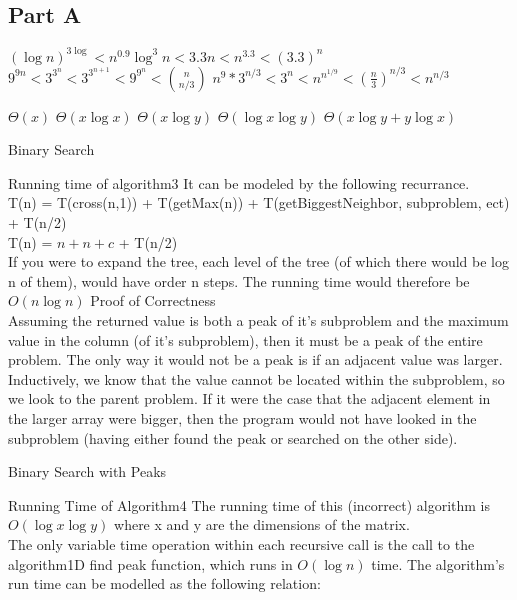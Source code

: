 \documentclass[12pt,twoside]{article}
\begin{document}
\begin{problems}
\section*{Part A}
\problem
\begin{problemparts}
\problempart $(\log n)^{3 \log } <  n^{0.9}\log^3n < 3.3n < n^{3.3}  < (3.3)^n$
\problempart $9^{9n} < 3^{3^n} < 3^{3^{n+1}}< 9^{9^n} < \binom{n}{n/3}$
\problempart $n^9*3^{n/3} < 3^n < n^{n^{1/9}}  < \left(\frac{n}{3}\right)^{n/3} < n^{n/3}$
\end{problemparts}
\problem
\begin{problemparts}
\problempart $\Theta(x)$
\problempart $\Theta(x \log x)$
\problempart $\Theta(x \log y)$
\problempart $\Theta( \log x \log y )$
\problempart $\Theta(x\log y + y \log x)$
\end{problemparts}
\problem Binary Search
\begin{problemparts}
\problempart Running time of algorithm3
It can be modeled by the following recurrance.\\
T(n) = T(cross(n,1)) + T(getMax(n)) + T(getBiggestNeighbor, subproblem, ect) + T(n/2)\\
T(n) = $n + n + c$ + T(n/2)\\
If you were to expand the tree, each level of the tree (of which there would be log n of them), would have order n steps.  The running time would
therefore be $O(n \log n)$
\problempart Proof of Correctness\\
Assuming the returned value is both a peak of it's subproblem and the maximum value in the column (of it's subproblem), then it must be a peak 
of the entire problem.  The only way it would not be a peak is if an adjacent value was larger.  Inductively, we know that the value cannot be
located within the subproblem, so we look to the parent problem.  If it were the case that the adjacent element in the larger array were bigger,
then the program would not have looked in the subproblem (having either found the peak or searched on the other side).
\end{problemparts}
\problem Binary Search with Peaks
\begin{problemparts}
\problempart Running Time of Algorithm4
The running time of this (incorrect) algorithm is $O(\log x \log y)$ where x and y are the dimensions of the matrix. \\
The only variable time operation within each recursive call is the call to the algorithm1D find peak function, which runs in $O(\log n)$ time.  The algorithm's run time can be modelled as the following relation: \\

\end{problemparts}
\end{problems}
\end{document}
